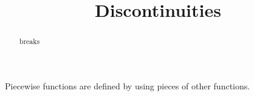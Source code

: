 \documentclass{ximera}
\title{Discontinuities}
\begin{document}
\begin{abstract}
breaks
\end{abstract}
\maketitle



Piecewise functions are defined by using pieces of other functions.
\end{document}
